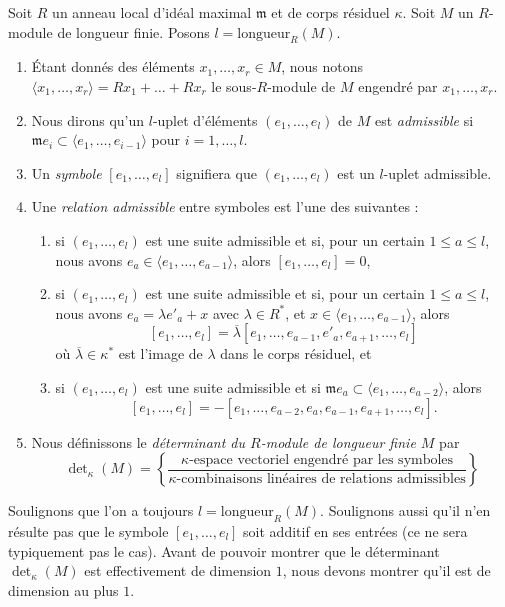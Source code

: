 \begin{definition}
\label{definition-determinant}
Soit $R$ un anneau local d'idéal maximal $\mathfrak m$ et de
corps résiduel $\kappa$. Soit $M$ un $R$-module de longueur finie.
Posons $l = \text{longueur}_R(M)$.
\begin{enumerate}
\item Étant donnés des éléments $x_1, \ldots, x_r \in M$, nous notons
$\langle x_1, \ldots, x_r \rangle = Rx_1 + \ldots + Rx_r$ le
sous-$R$-module de $M$ engendré par $x_1, \ldots, x_r$.
\item Nous dirons qu'un $l$-uplet d'éléments
$(e_1, \ldots, e_l)$ de $M$ est {\it admissible} si
$\mathfrak m e_i \subset \langle e_1, \ldots, e_{i - 1} \rangle$
pour $i = 1, \ldots, l$.
\item Un {\it symbole} $[e_1, \ldots, e_l]$ signifiera que
$(e_1, \ldots, e_l)$ est un $l$-uplet admissible.
\item Une {\it relation admissible} entre symboles est l'une des suivantes :
\begin{enumerate}
\item si $(e_1, \ldots, e_l)$ est une suite admissible et si,
pour un certain $1 \leq a \leq l$, nous avons
$e_a \in \langle e_1, \ldots, e_{a - 1}\rangle$, alors
$[e_1, \ldots, e_l] = 0$,
\item si $(e_1, \ldots, e_l)$ est une suite admissible et si,
pour un certain $1 \leq a \leq l$, nous avons $e_a = \lambda e'_a + x$
avec $\lambda \in R^*$, et
$x \in \langle e_1, \ldots, e_{a - 1}\rangle$, alors
$$
[e_1, \ldots, e_l] =
\overline{\lambda} [e_1, \ldots, e_{a - 1}, e'_a, e_{a + 1}, \ldots, e_l]
$$
où $\overline{\lambda} \in \kappa^*$ est l'image de $\lambda$ dans
le corps résiduel, et
\item si $(e_1, \ldots, e_l)$ est une suite admissible et si
$\mathfrak m e_a \subset \langle e_1, \ldots, e_{a - 2}\rangle$, alors
$$
[e_1, \ldots, e_l] =
- [e_1, \ldots, e_{a - 2}, e_a, e_{a - 1}, e_{a + 1}, \ldots, e_l].
$$
\end{enumerate}
\item
Nous définissons le {\it déterminant du $R$-module de longueur finie $M$} par
$$
\det\nolimits_\kappa(M) =
\left\{
\frac{\kappa\text{-espace vectoriel engendré par les symboles}}
{\kappa\text{-combinaisons linéaires de relations admissibles}}
\right\}
$$
\end{enumerate}
\end{definition}

\noindent
Soulignons que l'on a toujours $l = \text{longueur}_R(M)$. Soulignons aussi qu'il
n'en résulte pas que le symbole $[e_1, \ldots, e_l]$ soit
additif en ses entrées (ce ne sera typiquement pas le cas).
Avant de pouvoir montrer que le déterminant $\det_\kappa(M)$ est effectivement
de dimension $1$, nous devons montrer qu'il est de dimension au plus $1$.

